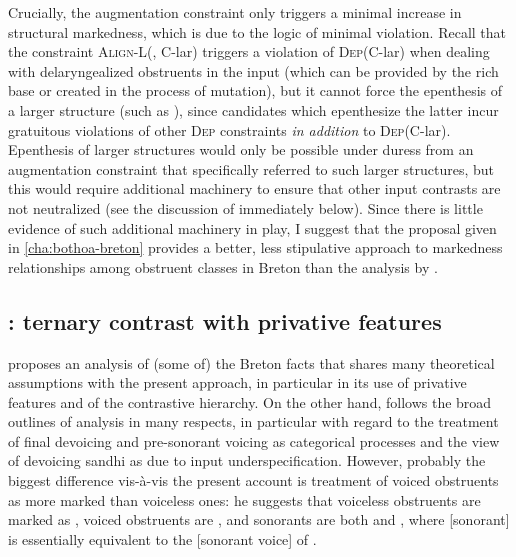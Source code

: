 Crucially, the augmentation constraint only triggers a minimal increase in structural markedness, which is due to the logic of minimal violation. Recall that the constraint \textsc{Align-L}(\sy, C-lar) triggers a violation of \textsc{Dep}(C-lar) when dealing with delaryngealized obstruents in the input (which can be provided by the rich base or created in the process of mutation), but it cannot force the epenthesis of a larger structure (such as ), since candidates which epenthesize the latter incur gratuitous violations of other \textsc{Dep} constraints \emph{in addition} to \textsc{Dep}(C-lar). Epenthesis of larger structures would only be possible under duress from an augmentation constraint that specifically referred to such larger structures, but this would require additional machinery to ensure that other input contrasts are not neutralized (see the discussion of \citealt{hall09:_laryn_breton} immediately below). Since there is little evidence of such additional machinery in play, I suggest that the proposal given in \cref{cha:bothoa-breton} provides a better, less stipulative approach to markedness relationships among obstruent classes in Breton than the analysis by \citet{kramer-breton}.

\subsection{\citet{hall09:_laryn_breton}: ternary contrast with privative features}
\label{sec:citeth-tern-contr}

\citet{hall09:_laryn_breton} proposes an analysis of (some of) the Breton facts that shares many theoretical assumptions with the present approach, in particular in its use of privative features and of the contrastive hierarchy. On the other hand, \citet{hall09:_laryn_breton} follows the broad outlines of  analysis in many respects, in particular with regard to the treatment of final devoicing and pre\hyp sonorant voicing as categorical processes and the view of devoicing sandhi as due to input underspecification. However, probably the biggest difference vis\hyp à\hyp vis the present account is  treatment of voiced obstruents as more marked than voiceless ones: he suggests that voiceless obstruents are marked as , voiced obstruents are , and sonorants are both  and \featurestring{\rt, [sonorant]}, where [sonorant] is essentially equivalent to the [sonorant voice] of \citet{rice89,rice92,rice1993,avery96:_repres_of_voicin_contr}.

